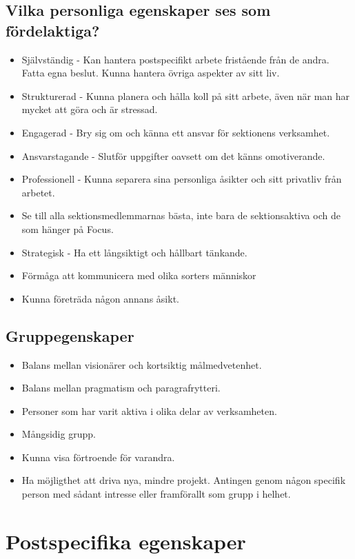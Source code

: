 \documentclass[a4paper]{article}
\begin{document}
\subsection*{Vilka personliga egenskaper ses som fördelaktiga?}
\begin{itemize}
\item Självständig - Kan hantera postspecifikt arbete fristående från de andra. Fatta egna beslut. Kunna hantera övriga aspekter av sitt liv.
\item Strukturerad - Kunna planera och hålla koll på sitt arbete, även när man har mycket att göra och är stressad.
\item Engagerad - Bry sig om och känna ett ansvar för sektionens verksamhet.
\item Ansvarstagande - Slutför uppgifter oavsett om det känns omotiverande.
\item Professionell - Kunna separera sina personliga åsikter och sitt privatliv från arbetet.
\item Se till alla sektionsmedlemmarnas bästa, inte bara de sektionsaktiva och de som hänger på Focus.
\item Strategisk - Ha ett långsiktigt och hållbart tänkande.
\item Förmåga att kommunicera med olika sorters människor
\item Kunna företräda någon annans åsikt.
\end{itemize}
\subsection*{Gruppegenskaper}
\begin{itemize}
\item Balans mellan visionärer och kortsiktig målmedvetenhet.
\item Balans mellan pragmatism och paragrafrytteri.
\item Personer som har varit aktiva i olika delar av verksamheten.
\item Mångsidig grupp.
\item Kunna visa förtroende för varandra.
\item Ha möjligthet att driva nya, mindre projekt. Antingen genom någon specifik person med sådant intresse eller framförallt som grupp i helhet.
\end{itemize}

\section*{Postspecifika egenskaper}
\end{document}

